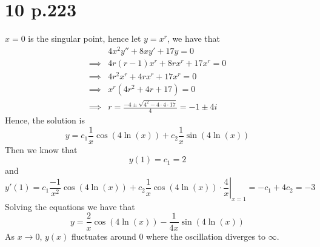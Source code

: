 \documentclass[11pt]{article}
\begin{document}
\section*{10 p.223}
$x=0$ is the singular point, hence let $y = x^r$, we have that 
\begin{equation*}
    \begin{aligned}
        & 4x^2y'' + 8xy' + 17y = 0  \\
        \implies & 4r(r-1)x^r + 8rx^r + 17x^r = 0 \\
        \implies & 4r^2x^r + 4rx^r + 17x^r = 0 \\
        \implies & x^r(4r^2+4r+17) = 0 \\
        \implies &r = \frac{-4 \pm \sqrt{4^2-4\cdot 4 \cdot 17}}{4} =  -1 \pm 4i
    \end{aligned}
\end{equation*}
Hence, the solution is 
\[
    y = c_1\frac{1}{x}\cos\left(4\ln(x)\right) + c_2\frac{1}{x}\sin\left(4\ln(x)\right)   
\]
Then we know that 
\[
    y(1) = c_1 = 2
\] 
and 
\[
    y'(1) = \left. c_1 \frac{-1}{x^2}\cos(4\ln(x)) + c_2 \frac{1}{x} \cos(4\ln(x)) \cdot \frac{4}{x} \right|_{x=1} = -c_1 + 4c_2 = -3    
\]
Solving the equations we have that 
\[
    y = \frac{2}{x}\cos\left(4\ln(x)\right) -\frac{1}{4x}\sin\left(4\ln(x)\right)   
\]
As $x\to 0$, $y(x)$ fluctuates around 0 where the oscillation diverges to $\infty$. 
\newpage
\end{document}

